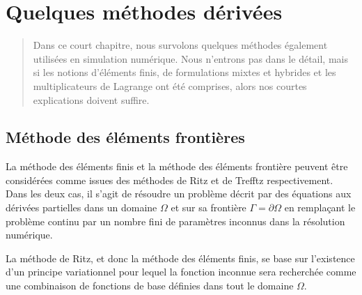 \chapter{Quelques méthodes dérivées}\label{Ch-XFEM}
\begin{abstract} Dans ce court chapitre, nous survolons quelques méthodes également utilisées en simulation numérique. Nous n'entrons pas dans le détail, mais si les notions d'éléments finis, de formulations mixtes et hybrides et les multiplicateurs de Lagrange ont été comprises, alors nos courtes explications doivent suffire.
\end{abstract} %


\medskip
\section{Méthode des éléments frontières}\label{Sec-BEM}
La méthode des éléments finis et la méthode des éléments frontière peuvent être considérées comme issues des méthodes de Ritz et de Trefftz respectivement. Dans les deux cas, il s'agit de résoudre un problème décrit par des équations aux dérivées partielles dans un domaine $\Omega$ et sur sa frontière $\Gamma=\partial\Omega$ en remplaçant le problème continu par un nombre fini de paramètres inconnus dans la résolution numérique.

\medskip
La méthode de Ritz, et donc la méthode des éléments finis, se base sur l'existence d'un principe variationnel pour lequel la fonction inconnue sera recherchée comme une combinaison de fonctions de base définies dans tout le domaine $\Omega$.

